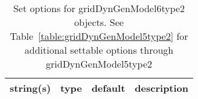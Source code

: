 \begin{table}[ht]
\centering
\begin{tabular}{p{5cm} c c p{7cm}}
\hline
string(s) & type & default & description \\
\hline
\hline
\end{tabular}
\caption{Set options for gridDynGenModel6type2 objects. See Table~\ref{table:gridDynGenModel5type2} for additional settable options through gridDynGenModel5type2}
\label{table:gridDynGenModel6type2}
\end{table}

